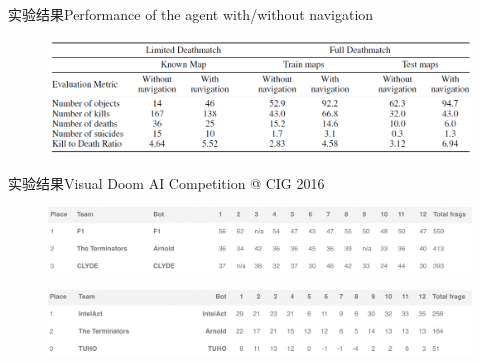 \documentclass[10pt]{beamer}
\begin{document}
	\begin{frame}{实验结果}{Performance of the agent with/without navigation}
		\begin{figure}
			\centering
			\includegraphics[width=0.9\linewidth]{pictures/fps-exper-result-1}
		\end{figure}
	\end{frame}

	\begin{frame}{实验结果}{Visual Doom AI Competition @ CIG 2016}
		\begin{figure}
			\centering
			\includegraphics[width=0.9\linewidth]{pictures/fps-exper-result-2}
		\end{figure}
		\begin{figure}
			\centering
			\includegraphics[width=0.9\linewidth]{pictures/fps-exper-result-3}
		\end{figure}
	\end{frame}
\end{document}

